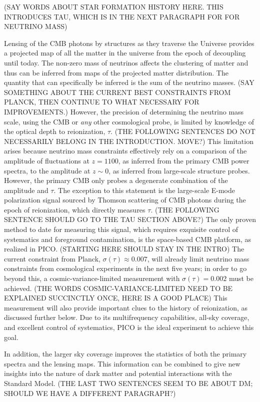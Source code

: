 \documentclass[PICOReport.tex]{subfiles}
\begin{document}
(SAY WORDS ABOUT STAR FORMATION HISTORY HERE. THIS INTRODUCES TAU, WHICH IS IN THE NEXT 
PARAGRAPH FOR FOR NEUTRINO MASS)

Lensing of the CMB photons by structures as they traverse the Universe provides a projected map of all the matter 
in the universe from the epoch of decoupling until today.  The non-zero mass of neutrinos affects the clustering of 
matter and thus can be inferred from maps of the projected matter distribution. The quantity that can specifically be 
inferred is the sum of the neutrino masses. (SAY SOMETHING ABOUT THE CURRENT BEST CONSTRAINTS FROM PLANCK, 
THEN CONTINUE TO WHAT NECESSARY FOR IMPROVEMENTS.) 
However, the precision of determining 
the neutrino mass scale, using the CMB or {\it any} other cosmological probe, is limited by knowledge of 
the optical depth to reionization, $\tau$.  (THE FOLLOWING SENTENCES DO NOT NECESSARILY BELONG 
IN THE INTRODUCTION. MOVE?) This limitation arises because neutrino mass constraints effectively 
rely on a comparison of the amplitude of fluctuations at $z=1100$, as inferred from the primary 
CMB power spectra, to the amplitude at $z \sim 0$, as inferred from large-scale structure probes.  
However, the primary CMB only probes a degenerate combination of the amplitude and $\tau$.  
The exception to this statement is the large-scale E-mode polarization signal sourced by Thomson 
scattering of CMB photons during the epoch of reionization, which directly measures $\tau$.  
(THE FOLLOWING SENTENCE SHOULD GO TO THE TAU SECTION ABOVE?) 
The only proven method to date for measuring this signal, which requires exquisite control of systematics 
and foreground contamination, is the space-based CMB platform, as realized in PICO.  
(STARTING HERE SHOULD STAY IN THE INTRO) 
The current constraint from Planck, $\sigma(\tau) \approx 0.007$, will already limit neutrino mass 
constraints from cosmological experiments in the next five years; in order to go beyond this, a 
cosmic-variance-limited measurement with $\sigma(\tau) = 0.002$ must be achieved. (THE WORDS
COSMIC-VARIANCE-LIMITED NEED TO BE EXPLAINED SUCCINCTLY ONCE, HERE IS A GOOD PLACE) 
This measurement will also provide important clues to the history of reionization, as discussed further below.  
Due to its multifrequency capabilities, all-sky coverage, and excellent control of systematics, 
PICO is the ideal experiment to achieve this goal.

In addition, the larger sky coverage improves the statistics of both the primary spectra and the lensing maps.  
This information can be combined to give new insights into the nature of dark matter and potential interactions 
with the Standard Model. (THE LAST TWO SENTENCES SEEM TO BE ABOUT DM; SHOULD WE HAVE A DIFFERENT 
PARAGRAPH?)
\end{document}

